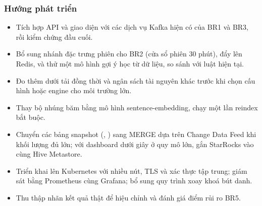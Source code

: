 \subsubsection{Hướng phát triển}

\begin{itemize}
  \item Tích hợp API và giao diện với các dịch vụ Kafka hiện có của BR1 và BR3, rồi kiểm chứng đầu cuối.
  \item Bổ sung nhánh đặc trưng phiên cho BR2 (cửa sổ phiên 30 phút), đẩy  lên Redis, và thử một mô hình gợi ý học từ dữ liệu, so sánh với luật hiện tại.
  \item Đo thêm dưới tải đồng thời và ngân sách tài nguyên khác trước khi chọn cấu hình hoặc engine cho môi trường lớn.
  \item Thay bộ nhúng băm bằng mô hình sentence-embedding, chạy một lần reindex bắt buộc.
  \item Chuyển các bảng snapshot (, ) sang MERGE dựa trên Change Data Feed khi khối lượng đủ lớn; với dashboard dưới giây ở quy mô lớn, gắn StarRocks vào cùng Hive Metastore.
  \item Triển khai lên Kubernetes với nhiều nút, TLS và xác thực tập trung; giám sát bằng Prometheus cùng Grafana; bổ sung quy trình xoay khoá bút danh.
  \item Thu thập nhãn kết quả thật để hiệu chỉnh và đánh giá điểm rủi ro BR5.
\end{itemize}

